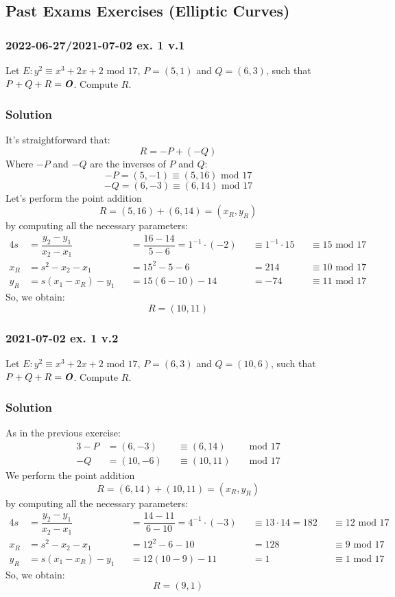\documentclass[11pt, a4paper]{article}
\newcommand{\mymod}{
    \text{ mod }
}
\begin{document}
\newpage
\subsection{Past Exams Exercises (Elliptic Curves)}
\subsubsection{2022-06-27/2021-07-02 ex. 1 v.1}
Let $E:y^2\equiv x^3+2x+2\mymod 17$, $P=(5,1)$ and $Q=(6,3)$, such that $P+Q+R=\text{\textbf{\textit{O}}}$. Compute $R$.
\subsubsection*{Solution}
It's straightforward that:
$$R=-P+(-Q)$$
Where $-P$ and $-Q$ are the inverses of $P$ and $Q$:
$$-P=(5, -1)\equiv(5,16)\mymod17$$
$$-Q=(6,-3)\equiv(6,14)\mymod17$$
Let's perform the point addition
$$R=(5,16)+(6,14)=(x_R,y_R)$$
by computing all the necessary parameters:
\begin{alignat*}{4}
    s&=\dfrac{y_2-y_1}{x_2-x_1}&&=\dfrac{16-14}{5-6}=1^{-1}\cdot (-2)&&\equiv 1^{-1}\cdot 15&&\equiv15\mymod17\\
    x_R&=s^2-x_2-x_1&&=15^2-5-6&&=214&&\equiv10\mymod17\\
    y_R&=s(x_1-x_R)-y_1&&=15(6-10)-14&&=-74&&\equiv11\mymod17
\end{alignat*}
So, we obtain:
$$R=(10,11)$$

\subsubsection{2021-07-02 ex. 1 v.2}
Let $E:y^2\equiv x^3+2x+2\mymod 17$, $P=(6,3)$ and $Q=(10,6)$, such that $P+Q+R=\text{\textbf{\textit{O}}}$. Compute $R$.
\subsubsection*{Solution}
As in the previous exercise:
\begin{alignat*}{3}
    -P&=(6,-3)&&\equiv(6,14)&&\mymod17\\
    -Q&=(10,-6)&&\equiv(10,11)&&\mymod17
\end{alignat*}
We perform the point addition
$$R=(6,14)+(10,11)=(x_R,y_R)$$
by computing all the necessary parameters:
\begin{alignat*}{4}
    s&=\dfrac{y_2-y_1}{x_2-x_1}&&=\dfrac{14-11}{6-10}=4^{-1}\cdot (-3)&&\equiv 13\cdot 14=182&&\equiv12\mymod17\\
    x_R&=s^2-x_2-x_1&&=12^2-6-10&&=128&&\equiv9\mymod17\\
    y_R&=s(x_1-x_R)-y_1&&=12(10-9)-11&&=1&&\equiv1\mymod17
\end{alignat*}
So, we obtain:
$$R=(9,1)$$
\end{document}
